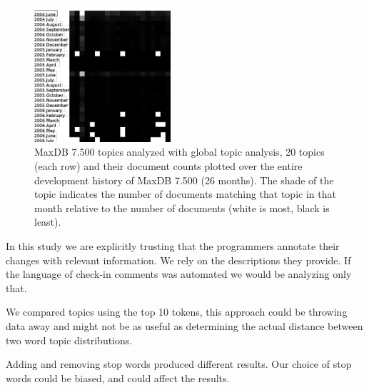 \documentclass[times, 10pt,twocolumn]{article}
\newcommand{\shrinkit}{\vspace*{-.3em}}
\begin{document}
\begin{figure}[t]
  \centering
  \includegraphics[width=0.45\textwidth]{month}
  \caption{MaxDB 7.500 topics analyzed with global topic analysis, 20
    topics (each row) and their document counts plotted over the
    entire development history of MaxDB 7.500 (26 months). The shade
    of the topic indicates the number of documents matching that topic
    in that month relative to the number of documents (white is most,
    black is least).}
  \label{fig:statictopics}
\end{figure}




\shrinkit
{}
\shrinkit

In this study we are explicitly trusting that the programmers annotate
their changes with relevant information. We rely on the descriptions
they provide. If the language of check-in comments was automated we
would  be analyzing only that.

We compared topics using the top 10 tokens, this approach could be
throwing data away and might not be as useful as determining the
actual distance between two word topic distributions.


Adding and removing stop words produced different results. Our choice
of stop words could be biased, and could affect the results.
\end{document}
